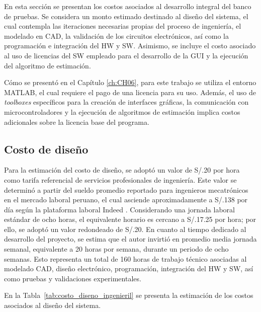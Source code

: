 \noindent
En esta sección se presentan los costos asociados al desarrollo integral del banco de pruebas. Se considera un monto estimado destinado al diseño del sistema, el cual contempla las iteraciones necesarias propias del proceso de ingeniería, el modelado en \ac{CAD}, la validación de los circuitos electrónicos, así como la programación e integración del \ac{HW} y \ac{SW}. Asimismo, se incluye el costo asociado al uso de licencias del \ac{SW} empleado para el desarrollo de la \ac{GUI} y la ejecución del algoritmo de estimación.

\noindent
Cómo se presentó en el Capítulo \ref{ch:CH06}, para este trabajo se utiliza el entorno MATLAB, el cual requiere el pago de una licencia para su uso. Además, el uso de \textit{toolboxes} específicos para la creación de interfaces gráficas, la comunicación con microcontroladores y la ejecución de algoritmos de estimación implica costos adicionales sobre la licencia base del programa.
\subsection{Costo de diseño}

\noindent
Para la estimación del costo de diseño, se adoptó un valor de S/.20 por hora como tarifa referencial de servicios profesionales de ingeniería. Este valor se determinó a partir del sueldo promedio reportado para ingenieros mecatrónicos en el mercado laboral peruano, el cual asciende aproximadamente a S/.138 por día según la plataforma laboral Indeed \autocite{indeed_mecatronica_2026}. Considerando una jornada laboral estándar de ocho horas, el equivalente horario es cercano a S/.17.25 por hora; por ello, se adoptó un valor redondeado de S/.20.
\noindent
En cuanto al tiempo dedicado al desarrollo del proyecto, se estima que el autor invirtió en promedio media jornada semanal, equivalente a 20 horas por semana, durante un periodo de ocho semanas. Esto representa un total de 160 horas de trabajo técnico asociadas al modelado \ac{CAD}, diseño electrónico, programación, integración del \ac{HW} y \ac{SW}, así como pruebas y validaciones experimentales.

\noindent
En la Tabla~\ref{tab:costo_diseno_ingenieril} se presenta la estimación de los costos asociados al diseño del sistema.

